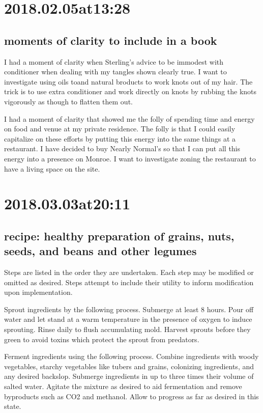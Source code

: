 \begin{enumerate}
\begin{enumerate}
\section*{ 2018.02.05at13:28 }
\subsection*{ moments of clarity to include in a book }
I had a moment of clarity when Sterling's advice to be immodest with conditioner when dealing with my tangles shown clearly true. I want to investigate using oils toand natural broducts to work knots out of my hair. The trick is to use extra conditioner and work directly on knots by rubbing the knots vigorously as though to flatten them out.

I had a moment of clarity that showed me the folly of spending time and energy on food and venue at my private residence. The folly is that I could easily capitalize on these efforts by putting this energy into the same things at a restaurant. I have decided to buy Nearly Normal's so that I can put all this energy into a presence on Monroe. I want to investigate zoning the restaurant to have a living space on the site.

\section*{ 2018.03.03at20:11 }
\subsection*{ recipe: healthy preparation of grains, nuts, seeds, and beans and other legumes }
Steps are listed in the order they are undertaken.
Each step may be modified or omitted as desired.
Steps attempt to include their utility to inform modification upon implementation.

Sprout ingredients by the following process.
Submerge at least 8 hours.
Pour off water and let stand at a warm temperature in the presence of oxygen to induce sprouting.
Rinse daily to flush accumulating mold.
Harvest sprouts before they green to avoid toxins which protect the sprout from predators.

Ferment ingredients using the following process.
Combine ingredients with woody vegetables, starchy vegetables like tubers and grains, colonizing ingredients, and any desired backslop.
Submerge ingredients in up to three times their volume of salted water.
Agitate the mixture as desired to aid fermentation and remove byproducts such as CO2 and methanol.
Allow to progress as far as desired in this state.


\end{enumerate}
\end{enumerate}
